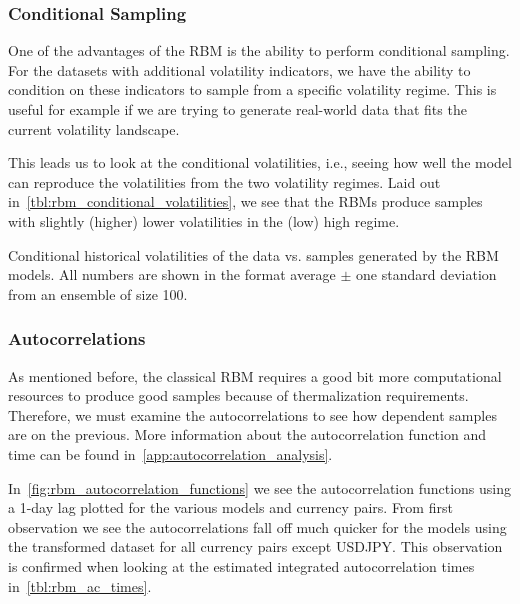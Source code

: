 \subsubsection{Conditional Sampling}
One of the advantages of the RBM is the ability to perform conditional sampling.
For the datasets with additional volatility indicators, we have the ability to condition on these indicators to sample from a specific volatility regime.
This is useful for example if we are trying to generate real-world data that fits the current volatility landscape.

This leads us to look at the conditional volatilities, i.e., seeing how well the model can reproduce the volatilities from the two volatility regimes.
Laid out in~\cref{tbl:rbm_conditional_volatilities}, we see that the RBMs produce samples with slightly (higher) lower volatilities in the (low) high regime.
\begin{table}[!htb]
    \centering
    \begin{adjustbox}{max width=\textwidth}
        
    \end{adjustbox}
    \caption{Conditional historical volatilities of the data vs. samples generated by the RBM models. All numbers are shown in the format average \(\pm\) one standard deviation from an ensemble of size 100.}
    \label{tbl:rbm_conditional_volatilities}
\end{table}

\subsubsection{Autocorrelations}
As mentioned before, the classical RBM requires a good bit more computational resources to produce good samples because of thermalization requirements.
Therefore, we must examine the autocorrelations to see how dependent samples are on the previous.
More information about the autocorrelation function and time can be found in~\cref{app:autocorrelation_analysis}.

In~\cref{fig:rbm_autocorrelation_functions} we see the autocorrelation functions using a 1-day lag plotted for the various models and currency pairs.
From first observation we see the autocorrelations fall off much quicker for the models using the transformed dataset for all currency pairs except USDJPY.
This observation is confirmed when looking at the estimated integrated autocorrelation times in~\cref{tbl:rbm_ac_times}.

